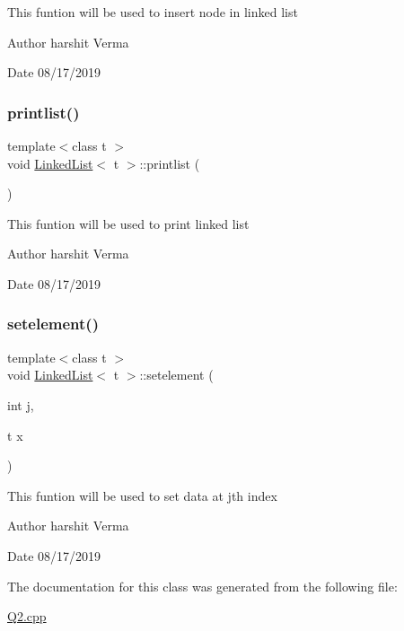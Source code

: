 This funtion will be used to insert node in linked list \begin{DoxyAuthor}{Author}
harshit Verma 
\end{DoxyAuthor}
\begin{DoxyDate}{Date}
08/17/2019 
\end{DoxyDate}
\mbox{\label{classLinkedList_a092b84e1a84706565ebd77ab5b01149c}} 
\subsubsection{\texorpdfstring{printlist()}{printlist()}}
{\footnotesize\ttfamily template$<$class t $>$ \\
void \hyperlink{classLinkedList}{Linked\+List}$<$ t $>$\+::printlist (\begin{DoxyParamCaption}{ }\end{DoxyParamCaption})\hspace{0.3cm}{\ttfamily [inline]}}

This funtion will be used to print linked list \begin{DoxyAuthor}{Author}
harshit Verma 
\end{DoxyAuthor}
\begin{DoxyDate}{Date}
08/17/2019 
\end{DoxyDate}
\mbox{\label{classLinkedList_a8b4f7e75614ba2adc39d51fd07ee7b63}} 
\subsubsection{\texorpdfstring{setelement()}{setelement()}}
{\footnotesize\ttfamily template$<$class t $>$ \\
void \hyperlink{classLinkedList}{Linked\+List}$<$ t $>$\+::setelement (\begin{DoxyParamCaption}\item[{int}]{j,  }\item[{t}]{x }\end{DoxyParamCaption})\hspace{0.3cm}{\ttfamily [inline]}}

This funtion will be used to set data at jth index \begin{DoxyAuthor}{Author}
harshit Verma 
\end{DoxyAuthor}
\begin{DoxyDate}{Date}
08/17/2019 
\end{DoxyDate}


The documentation for this class was generated from the following file\+:\begin{DoxyCompactItemize}
\item 
\hyperlink{Q2_8cpp}{Q2.\+cpp}\end{DoxyCompactItemize}
